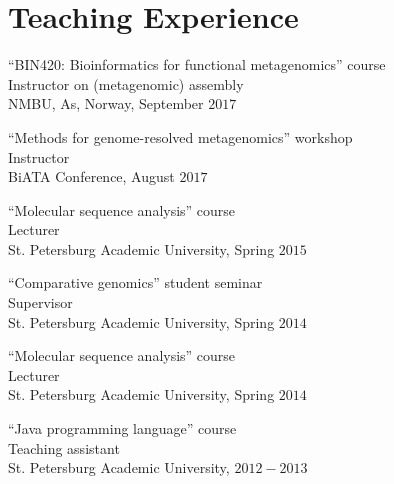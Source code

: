 \blankline

\section{Teaching Experience}
``BIN420: Bioinformatics for functional metagenomics'' course\\
Instructor on (metagenomic) assembly\\
NMBU, As, Norway, September $2017$

\blankline

``Methods for genome-resolved metagenomics'' workshop\\
Instructor\\
BiATA Conference, August $2017$

\blankline

``Molecular sequence analysis'' course\\
Lecturer\\
St. Petersburg Academic University, Spring $2015$

\blankline

``Comparative genomics'' student seminar\\
Supervisor\\
St. Petersburg Academic University, Spring $2014$

\blankline

``Molecular sequence analysis'' course\\
Lecturer\\
St. Petersburg Academic University, Spring $2014$

\blankline

``Java programming language'' course\\
Teaching assistant\\ 
St. Petersburg Academic University, $2012-2013$

